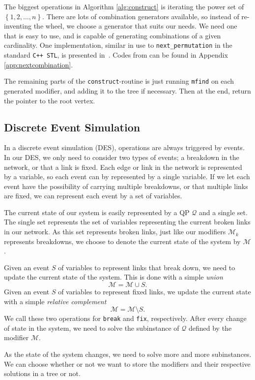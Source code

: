 The biggest operations in Algorithm \ref{alg:construct} is iterating the power
set of $\left\{1,2,\ldots,n\right\}$. There are lots of combination generators available, so
instead of re-inventing the wheel, we choose a generator that suits our needs.
We need one that is easy to use, and is capable of generating combinations of
a given cardinality. One implementation, similar in use to
\texttt{next\_permutation} in the standard \texttt{C++ STL}, is presented
in~\cite{codeproject}.
Codes from \cite{codeproject} can be found in Appendix
\ref{app:nextcombination}.

The remaining parts of the \texttt{construct}-routine is just running
\texttt{mfind} on each generated modifier, and adding it to the tree
if necessary. Then at the end, return the pointer to the root vertex.

\subsection{Discrete Event Simulation}
In a discrete event simulation (DES), operations are always triggered by events.
In our DES, we only need to consider two types of events; a breakdown in the network,
or that a link is fixed. Each edge or link in the network is represented by
a variable, so each event can by represented by a single variable.
If we let each event have the possibility of carrying multiple breakdowns, or that
multiple links are fixed, we can represent each event by a set of variables.

The current state of our system is easily represented by a QP $\mathcal{Q}$ and
a single set. The single set represents the set of variables representing
the current broken links in our network.
As this set represents broken links, just like our modifiers $\mathcal{M}_k$
represents breakdowns, we choose to denote the current state of the system
by $\mathcal{M}$. 

Given an event $S$ of variables to represent links that break down, we need
to update the current state of the system. This is done with a simple
\textit{union}
\[
\mathcal{M} = \mathcal{M} \cup S.
\]
Given an event $S$ of variables to represent fixed links, we update the current
state with a simple \textit{relative complement}
\[
\mathcal{M} = \mathcal{M} \setminus S.
\]
We call these two operations for \texttt{break} and \texttt{fix}, respectively.
After every change of state in the system, we need to solve the subinstance
of $\mathcal{Q}$ defined by the modifier $\mathcal{M}$.

As the state of the system changes, we need to solve more and more subinstances.
We can choose whether or not we want to store the modifiers and their respective
solutions in a tree or not.
